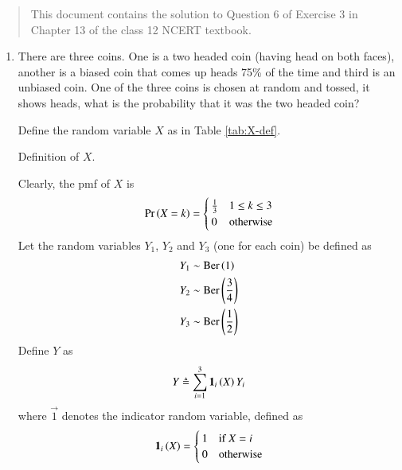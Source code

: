 \documentclass[journal,12pt,twocolumn]{IEEEtran}
\begin{document}
\begin{abstract}
    This document contains the solution to Question 6 of 
    Exercise 3 in Chapter 13 of the class 12 NCERT textbook.
\end{abstract}

\begin{enumerate}
    \item There are three coins. One is a two headed coin (having head on both 
    faces), another is a biased coin that comes up heads 75\% of the time and 
    third is an unbiased coin. One of the three coins is chosen at random and 
    tossed, it shows heads, what is the probability that it was the two headed 
    coin?

    \solution Define the random variable $X$ as in Table \ref{tab:X-def}.
    \begin{table}[!ht]
        \centering
        
        \caption{Definition of $X$.}
        \label{tab:X-def}
    \end{table}
    Clearly, the pmf of $X$ is
    \begin{align}
        \Pr\left(X=k\right) =
        \begin{cases}
            \frac{1}{3} & 1 \le k \le 3 \\
            0 & \textrm{otherwise}
        \end{cases} 
        \label{eq:X-pmf}
    \end{align}
    Let the random variables $Y_1$, $Y_2$ and $Y_3$ (one for each coin) be
    defined as
    \begin{align}
        Y_1 &\sim \textrm{Ber}\left(1\right) \label{eq:Y-1-def} \\
        Y_2 &\sim \textrm{Ber}\left(\frac{3}{4}\right) \label{eq:Y-2-def} \\
        Y_3 &\sim \textrm{Ber}\left(\frac{1}{2}\right) \label{eq:Y-3-def}
    \end{align}
    Define $Y$ as
    \begin{align}
        Y \triangleq \sum_{i=1}^3\mathbf{1}_i\left(X\right)Y_i
        \label{eq:Y-def}
    \end{align}
    where $\vec{1}$ denotes the indicator random variable, defined as
    \begin{align}
        \mathbf{1}_i\left(X\right) = 
        \begin{cases}
            1 & \textrm{if $X=i$} \\
            0 & \textrm{otherwise}
        \end{cases}
    \end{align}

\end{enumerate}
\end{document}
